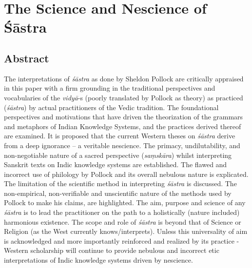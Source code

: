 \chapter{The Science and Nescience of Śāstra}\label{chapter11}
\vskip -10pt

\vskip -10pt


\section*{Abstract}

The interpretations of {\sl śāstra} as done by Sheldon Pollock are critically appraised in this paper with a firm grounding in the traditional perspectives and vocabularies of the {\sl vidyā}-s (poorly translated by Pollock as theory) as practiced ({\sl śāstra}) by actual practitioners of the Vedic tradition. The foundational perspectives and motivations that have driven the theorization of the grammars and metaphors of Indian Knowledge Systems, and the practices derived thereof are examined. It is proposed that the current Western theses on {\sl śāstra} derive from a deep ignorance -- a veritable nescience. The primacy, undilutability, and non-negotiable nature of a sacred perspective ({\sl saṃskāra}) whilst interpreting Sanskrit texts on Indic knowledge systems are established. The flawed and incorrect use of philology by Pollock and its overall nebulous nature is explicated. The limitation of the scientific method in interpreting {\sl śāstra} is discussed. The non-empirical, non-verifiable and unscientific nature of the methods used by Pollock to make his claims, are highlighted. The aim, purpose and science of any {\sl śāstra} is to lead the practitioner on the path to a holistically (nature included) harmonious existence. The scope and role of {\sl śāstra} is beyond that of Science or Religion (as the West currently knows/interprets). Unless this universality of aim is acknowledged and more importantly reinforced and realized by its practice - Western scholarship will continue to provide nebulous and incorrect etic interpretations of Indic knowledge systems driven by nescience.

